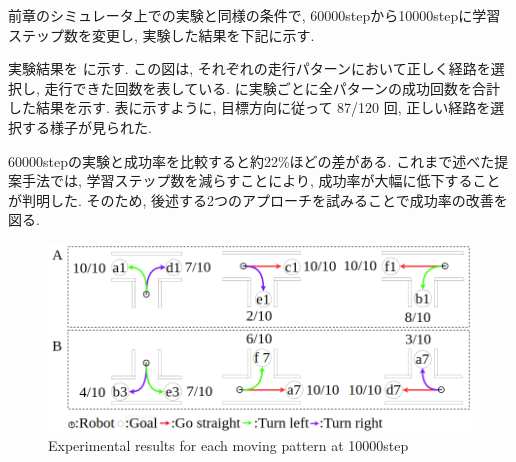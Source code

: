 





前章のシミュレータ上での実験と同様の条件で, 60000stepから10000stepに学習ステップ数を変更し, 実験した結果を下記に示す.

実験結果を  に示す. この図は, それぞれの走行パターンにおいて正しく経路を選択し, 走行できた回数を表している.  に実験ごとに全パターンの成功回数を合計した結果を示す. 表に示すように, 目標方向に従って 87/120 回, 正しい経路を選択する様子が見られた.

60000stepの実験と成功率を比較すると約22\%ほどの差がある. これまで述べた提案手法では, 学習ステップ数を減らすことにより, 成功率が大幅に低下することが判明した. そのため, 後述する2つのアプローチを試みることで成功率の改善を図る.

\vspace{0.5cm}

\begin{figure}[hbtp]
  \centering
 \includegraphics[keepaspectratio, scale=0.43]
      {images/10000step.png}
 \caption{Experimental results for each moving pattern at 10000step}
 \label{Fig:10000step}
\end{figure}  

